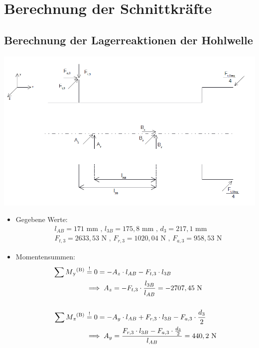 \newpage
\chapter{Berechnung der Schnittkräfte}
\section{Berechnung der Lagerreaktionen der Hohlwelle}
\begin{center}
	\includegraphics[width=1.04\textwidth,keepaspectratio]{figures/Hohlwelle.png}
\end{center}
\begin{itemize}
	\item Gegebene Werte: 
\begin{align*}
	&l_{AB} =171\text{ mm} \text{ , } l_{3B} = 175,8\text{ mm} \text{ , } d_{3} = 217,1\text{ mm}\\
	&F_{t,3} = 2633,53 \text{ N} \text{ , } F_{r,3}  = 1020,04\text{ N} \text{ , } F_{a,3} = 958,53 \text{ N}
\end{align*}
	\item Momentensummen:
\begin{align*}
	 \sum M\textsubscript{y}\textsuperscript{(B)} &\overset{!}{=} 0 = -A_z \cdot l_{AB} - F_{t,3} \cdot l_{3B} \\
	 	&\implies A_z = -F_{t,3} \cdot \frac{l_{3B}}{l_{AB}} = -2707,45 \text{ N} \\ \\
	 \sum M\textsubscript{z}\textsuperscript{(B)} &\overset{!}{=} 0 = -A_y \cdot l_{AB} + F_{r,3} \cdot l_{3B} - F_{a,3} \cdot \frac{d_3}{2}\\
	 	&\implies A_y = \frac{F_{r,3} \cdot l_{3B} - F_{a,3} \cdot \frac{d_3}{2}} {l_{AB}}= 440,2 \text{ N} 
\end{align*}
\end{itemize}
